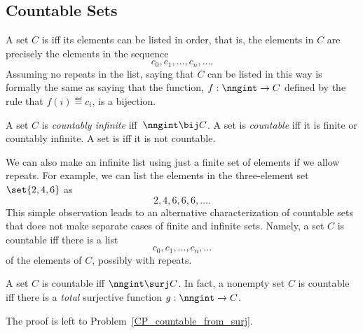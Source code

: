 \subsection{Countable Sets}\label{countable_subsec}
A set $C$ is  iff its elements can be listed in
order, that is, the elements in $C$ are precisely the elements in the
sequence
\[
c_0, c_1, \dots, c_n, \dots.
\]
Assuming no repeats in the list, saying that $C$ can be listed in this
way is formally the same as saying that the function, $f:\nngint \to
C$ defined by the rule that $f(i) \eqdef c_i$, is a bijection.

\begin{definition}
A set $C$ is \emph{countably infinite}%
 iff\  $\nngint \bij C$.  A
set is \emph{countable} iff it is finite or countably infinite.
A set is  iff it is not countable.
\end{definition}

We can also make an infinite list using just a finite set of elements
if we allow repeats.  For example, we can list the elements in the
three-element set $\set{2, 4, 6}$ as
\[
2,4,6,6,6,\dots.
\]
This simple observation leads to an alternative characterization of
countable sets that does not make separate cases of finite and
infinite sets.  Namely, a set $C$ is countable iff there is a list
\[
c_0, c_1, \dots, c_n, \dots
\]
of the elements of $C$, possibly with repeats.

\begin{lemma}\label{NsurjC}
A set $C$ is countable iff $\nngint \surj C$.  In fact, a nonempty
set $C$ is countable iff there is a \emph{total} surjective function
$g:\nngint \to C$.
\end{lemma}
The proof is left to Problem~\ref{CP_countable_from_surj}.

